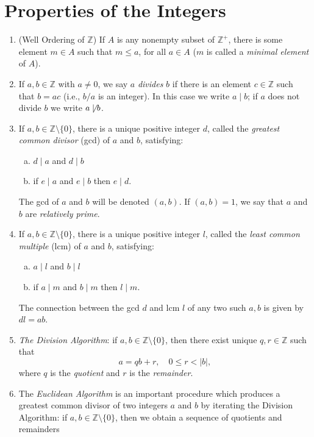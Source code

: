 \section{Properties of the Integers}
\begin{enumerate}[(1)]
    \item (Well Ordering of $\mathbb{Z}$)
    If $A$ is any nonempty subset of $\mathbb{Z}^+$, there is some element $m\in A$ such that $m\le a$, for all $a\in A$ ($m$ is called a \textit{minimal element} of $A$).
    \item If $a,b\in\mathbb{Z}$ with $a\neq0$, we say $a$ \textit{divides} $b$ if there is an element $c\in\mathbb{Z}$ such that $b=ac$ (i.e., $b/a$ is an integer).
    In this case we write $a\mid b$; if $a$ does not divide $b$ we write $a\not\mid b$.
    \item If $a,b\in\mathbb{Z}\setminus\{0\}$, there is a unique positive integer $d$, called the \textit{greatest common divisor} (gcd) of $a$ and $b$, satisfying:
    \begin{enumerate}[(a)]
        \item $d\mid a$ and $d\mid b$
        \item if $e\mid a$ and $e\mid b$ then $e\mid d$.
    \end{enumerate}
    The gcd of $a$ and $b$ will be denoted $(a,b)$.
    If $(a,b)=1$, we say that $a$ and $b$ are \textit{relatively prime}.
    \item If $a,b\in\mathbb{Z}\setminus\{0\}$, there is a unique positive integer $l$, called the \textit{least common multiple} (lcm) of $a$ and $b$, satisfying:
    \begin{enumerate}[(a)]
        \item $a\mid l$ and $b\mid l$
        \item if $a\mid m$ and $b\mid m$ then $l\mid m$.
    \end{enumerate}
    The connection between the gcd $d$ and lcm $l$ of any two such $a,b$ is given by $dl=ab$.
    \item \textit{The Division Algorithm}: if $a,b\in\mathbb{Z}\setminus\{0\}$, then there exist unique $q,r\in\mathbb{Z}$ such that 
    \[
        a=qb+r,\quad 0\le r<|b|,
    \]
    where $q$ is the \textit{quotient} and $r$ is the \textit{remainder}.
    \item  The \textit{Euclidean Algorithm} is an important procedure which produces a greatest common divisor of two integers $a$ and $b$ by iterating the Division Algorithm: 
    if $a,b\in\mathbb{Z}\setminus\{0\}$, then we obtain a sequence of quotients and remainders

\end{enumerate}
